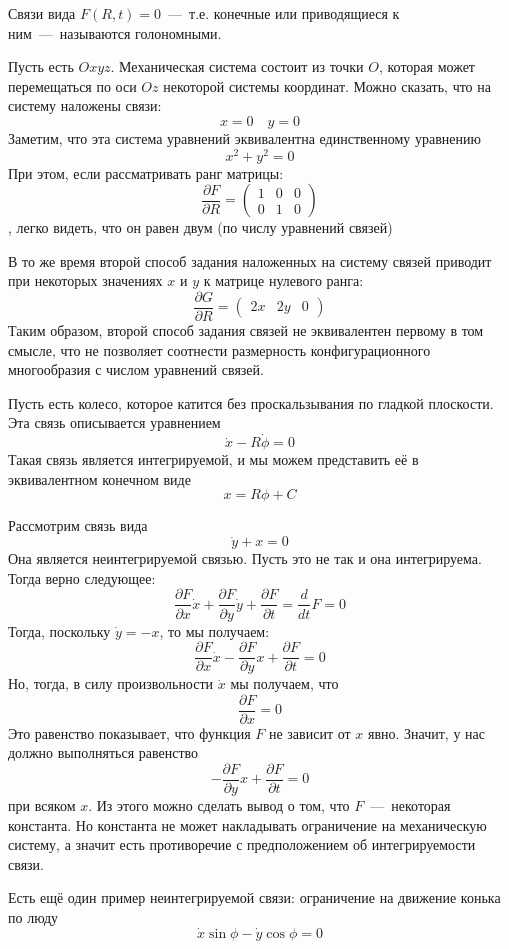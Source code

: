 \begin{definition}
    Связи вида $F(R, t) = 0$~---~т.е. конечные или приводящиеся к ним~---~называются голономными.
\end{definition}
\begin{example}
    Пусть есть $Oxyz$. Механическая система состоит из точки $O$, которая может перемещаться по оси $Oz$ некоторой системы координат. Можно сказать, что на систему наложены связи: \[x = 0 \quad y = 0\]
    Заметим, что эта система уравнений эквивалентна единственному уравнению \[x^2 + y^2 = 0\]
    При этом, если рассматривать ранг матрицы: \[\dfrac{\partial F}{\partial R} = \begin{pmatrix}
        1 & 0 & 0 \\ 0 & 1 & 0
    \end{pmatrix}\],
    легко видеть, что он равен двум (по числу уравнений связей)
    
    В то же время второй способ задания наложенных на систему связей приводит при некоторых значениях $x$ и $y$ к матрице нулевого ранга: \[\dfrac{\partial G}{\partial R} = \begin{pmatrix}
        2x & 2y & 0
    \end{pmatrix}\]
    Таким образом, второй способ задания связей не эквивалентен первому в том смысле, что не позволяет соотнести размерность конфигурационного многообразия с числом уравнений связей.
\end{example}
\begin{example}
    Пусть есть колесо, которое катится без проскальзывания по гладкой плоскости. Эта связь описывается уравнением \[\dot{x} - R\dot{\phi} = 0\]
    Такая связь является интегрируемой, и мы можем представить её в эквивалентном конечном виде \[x = R\phi + C\]
\end{example}
\begin{example}
    Рассмотрим связь вида \[ \dot{y} + x = 0\]
    Она является неинтегрируемой связью. Пусть это не так и она интегрируема. Тогда верно следующее: \[\dfrac{\partial F}{\partial x}\dot{x} + \dfrac{\partial F}{\partial y} \dot{y} + \dfrac{\partial F}{\partial t} = \dfrac{d}{dt} F = 0\]
    Тогда, поскольку $\dot{y} = -x$, то мы получаем: \[\dfrac{\partial F}{\partial x} \dot{x} - \dfrac{\partial F}{\partial y}x + \dfrac{\partial F}{\partial t} = 0\]
    Но, тогда, в силу произвольности $\dot{x}$ мы получаем, что \[\dfrac{\partial F}{\partial x} = 0\] Это равенство показывает, что функция $F$ не зависит от $x$ явно. Значит, у нас должно выполняться равенство \[-\dfrac{\partial F}{\partial y}x + \dfrac{\partial F}{\partial t} = 0\] при всяком $x$. Из этого можно сделать вывод о том, что $F$~---~некоторая константа. Но константа не может накладывать ограничение на механическую систему, а значит есть противоречие с предположением об интегрируемости связи.
\end{example}
\begin{example}
    Есть ещё один пример неинтегрируемой связи: ограничение на движение конька по люду \[\dot{x}\sin \phi - \dot{y}\cos \phi = 0\]
\end{example}
